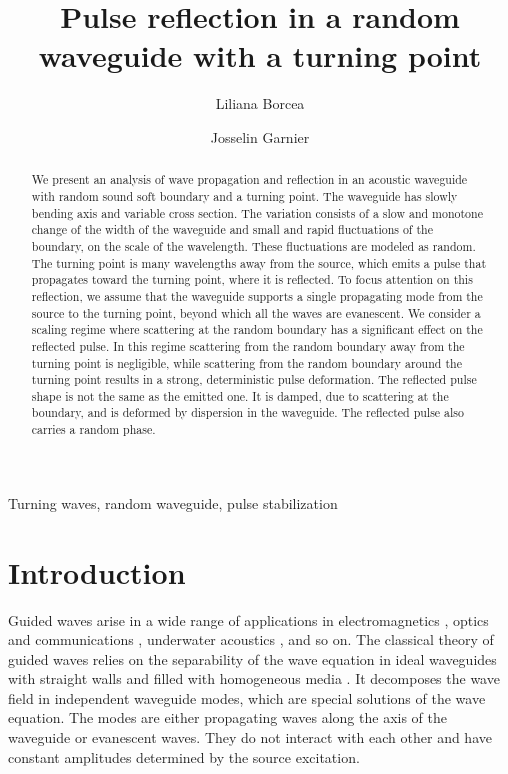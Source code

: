 \documentclass[final]{siamltex}
\begin{document}
\title{Pulse reflection in a random waveguide with a
  turning point} \author{Liliana Borcea\footnotemark[1] \and Josselin
  Garnier\footnotemark[2]} 
  
\maketitle

 

 

\begin{abstract}
We present an analysis of wave propagation and reflection in an acoustic waveguide
with random sound soft boundary and a turning point.  The waveguide
has slowly bending axis and variable cross section. The variation
consists of a slow and monotone change of the width of the waveguide
and small and rapid fluctuations of the boundary, on the scale of the
wavelength. These fluctuations are modeled as random. The turning
point is many wavelengths away from the source, which emits a pulse
that propagates toward the turning point, where it is reflected. To
focus attention on this reflection, we assume that the waveguide
supports a single propagating mode from the source to the turning
point, beyond which all the waves are evanescent.  We consider a
scaling regime where scattering at the random boundary has a
significant effect on the reflected pulse. In this regime 
scattering from the random boundary away from the turning point is negligible, 
while scattering from the random boundary around the turning point 
results in a strong, deterministic pulse deformation.
 The reflected pulse shape is not the same as the emitted one. It is
damped, due to scattering at the boundary, and is deformed by
dispersion in the waveguide. The reflected pulse also carries a random
phase.
\end{abstract}
\begin{keywords}
Turning waves, random waveguide, pulse stabilization
\end{keywords}

\section{Introduction}
Guided waves arise in a wide range of applications in electromagnetics
\cite{collin1960field}, optics and communications
\cite{marcuse2013theory}, underwater acoustics \cite{kohler77}, and so
on. The classical theory of guided waves relies on the separability of
the wave equation in ideal waveguides with straight walls and filled
with homogeneous media \cite{lord1945theory}.  It decomposes the wave
field in independent waveguide modes, which are special solutions of
the wave equation. The modes are either propagating waves along the
axis of the waveguide or evanescent waves. They do not interact with
each other and have constant amplitudes determined by the source
excitation.
\end{document}
